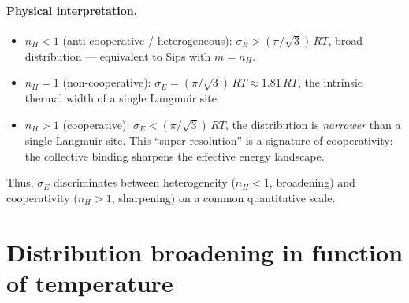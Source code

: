 	\paragraph{Physical interpretation.}
	\begin{itemize}
		\item $n_H < 1$ (anti-cooperative / heterogeneous):
		$\sigma_E > (\pi/\sqrt{3})\,RT$, broad distribution ---
		equivalent to Sips with $m = n_H$.
		\item $n_H = 1$ (non-cooperative):
		$\sigma_E = (\pi/\sqrt{3})\,RT \approx 1.81\,RT$,
		the intrinsic thermal width of a single Langmuir site.
		\item $n_H > 1$ (cooperative):
		$\sigma_E < (\pi/\sqrt{3})\,RT$, the distribution is
		\emph{narrower} than a single Langmuir site.  This
		``super-resolution'' is a signature of cooperativity:
		the collective binding sharpens the effective energy
		landscape.
	\end{itemize}
	Thus, $\sigma_E$ discriminates between heterogeneity
	($n_H < 1$, broadening) and cooperativity ($n_H > 1$,
	sharpening) on a common quantitative scale.

	\section{Distribution broadening in function of temperature}

